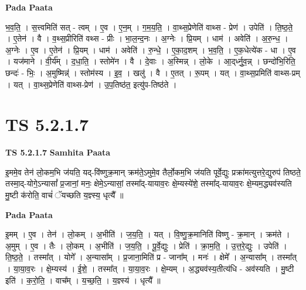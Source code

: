 \documentclass[17pt]{extarticle}
\begin{document}
\textbf{Pada Paata} \newline

भ॒व॒ति॒ । स॒त्त्वमिति॑ सत् - त्वम् । ए॒व । ए॒न॒म् । ग॒म॒य॒ति॒ । वा॒थ्स॒प्रेणेति॑ वाथ्स - प्रेण॑ । उपेति॑ । ति॒ष्ठ॒ते॒ । ए॒तेन॑ । वै । व॒थ्स॒प्रीरिति॑ वथ्स - प्रीः । भा॒ल॒न्द॒नः । अ॒ग्नेः । प्रि॒यम् । धाम॑ । अवेति॑ । अ॒रु॒न्ध॒ । अ॒ग्नेः । ए॒व । ए॒तेन॑ । प्रि॒यम् । धाम॑ । अवेति॑ । रु॒न्धे॒ । ए॒का॒द॒शम् । भ॒व॒ति॒ । ए॒क॒धेत्ये॑क - धा । ए॒व । यज॑माने । वी॒र्य᳚म् । द॒धा॒ति॒ । स्तोमे॑न । वै । दे॒वाः । अ॒स्मिन्न् । लो॒के । आ॒द्‌र्ध्नु॒व॒न्न् । छन्दो॑भि॒रिति॒ छन्दः॑ - भिः॒ । अ॒मुष्मिन्न्॑ । स्तोम॑स्य । इ॒व॒ । खलु॑ । वै । ए॒तत् । रू॒पम् । यत् । वा॒थ्स॒प्रमिति॑ वाथ्स-प्रम् । यत् । वा॒थ्स॒प्रेणेति॑ वाथ्स-प्रेण॑ । उ॒प॒तिष्ठ॑त॒ इत्यु॑प-तिष्ठ॑ते ।  \newline





\section{ TS 5.2.1.7 }

\textbf{TS 5.2.1.7 } \newline
\textbf{Samhita Paata} \newline

इ॒ममे॒व तेन॑ लो॒कम॒भि ज॑यति॒ यद्-वि॑ष्णुक्र॒मान् क्रम॑ते॒ऽमुमे॒व तैर्लो॒कम॒भि ज॑यति पूर्वे॒द्युः प्रक्रा॑मत्युत्तरे॒द्युरुप॑ तिष्ठते॒ तस्मा॒द्-योगे॒ऽन्यासां᳚ प्र॒जानां॒ मनः॒ क्षेमे॒ऽन्यासां॒ तस्मा᳚द्-यायाव॒रः क्षे॒म्यस्ये॑शे॒ तस्मा᳚द्-यायाव॒रः क्षे॒म्यम॒द्ध्यव॑स्यति मु॒ष्टी क॑रोति॒ वाचं॑ ॅयच्छति य॒ज्ञ्स्य॒ धृत्यै᳚ ॥ \newline

\textbf{Pada Paata} \newline

इ॒मम् । ए॒व । तेन॑ । लो॒कम् । अ॒भीति॑ । ज॒य॒ति॒ । यत् । वि॒ष्णु॒क्र॒मानिति॑ विष्णु - क्र॒मान् । क्रम॑ते । अ॒मुम् । ए॒व । तैः । लो॒कम् । अ॒भीति॑ । ज॒य॒ति॒ । पू॒र्वे॒द्युः । प्रेति॑ । क्रा॒म॒ति॒ । उ॒त्त॒रे॒द्युः । उपेति॑ । ति॒ष्ठ॒ते॒ । तस्मा᳚त् । योगे᳚ । अ॒न्यासा᳚म् । प्र॒जाना॒मिति॑ प्र - जाना᳚म् । मनः॑ । क्षेमे᳚ । अ॒न्यासा᳚म् । तस्मा᳚त् । या॒या॒व॒रः । क्षे॒म्यस्य॑ । ई॒शे॒ । तस्मा᳚त् । या॒या॒व॒रः । क्षे॒म्यम् । अ॒द्ध्यव॑स्य॒तीत्य॑धि - अव॑स्यति । मु॒ष्टी इति॑ । क॒रो॒ति॒ । वाच᳚म् । य॒च्छ॒ति॒ । य॒ज्ञ्स्य॑ । धृत्यै᳚ ॥  \newline




\end{document}
